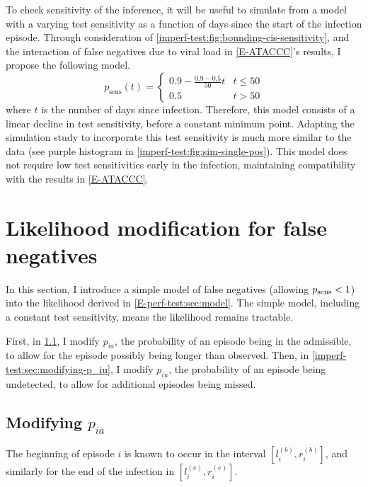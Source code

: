 \documentclass[thesis.tex]{subfiles}
\begin{document}
To check sensitivity of the inference, it will be useful to simulate from a model with a varying test sensitivity as a function of days since the start of the infection episode.
Through consideration of \cref{imperf-test:fig:bounding-cis-sensitivity}, and the interaction of false negatives due to viral load in \cref{E-ATACCC}'s results, I propose the following model.
\begin{equation}
  p_\text{sens}(t) = \begin{cases}
    0.9 - \frac{0.9-0.5}{50}t &t \leq 50 \\
    0.5 &t > 50
  \end{cases}
  \label{imperf-test:eq:variable-test-sensitivity}
\end{equation}
where $t$ is the number of days since infection.
Therefore, this model consists of a linear decline in test sensitivity, before a constant minimum point.
Adapting the simulation study to incorporate this test sensitivity is much more similar to the data (see purple histogram in \cref{imperf-test:fig:sim-single-pos}).
This model does not require low test sensitivities early in the infection, maintaining compatibility with the results in \cref{E-ATACCC}.

\section{Likelihood modification for false negatives} \label{imperf-test:sec:modelling}

In this section, I introduce a simple model of false negatives (\ie allowing $p_\text{sens} < 1$) into the likelihood derived in \cref{E-perf-test:sec:model}.
The simple model, including a constant test sensitivity, means the likelihood remains tractable.

First, in \cref{imperf-test:sec:modifying-p_ia}, I modify $p_{ia}$, the probability of an episode being in the admissible, to allow for the episode possibly being longer than observed.
Then, in \cref{imperf-test:sec:modifying-p_iu}, I modify $p_{iu}$, the probability of an episode being undetected, to allow for additional episodes being missed.

\subsection{Modifying \texorpdfstring{$p_{ia}$}{pia}} \label{imperf-test:sec:modifying-p_ia}

The beginning of episode $i$ is known to occur in the interval $[l_i^{(b)}, r_i^{(b)}]$, and similarly for the end of the infection in $[l_i^{(e)}, r_i^{(e)}]$.
\end{document}
